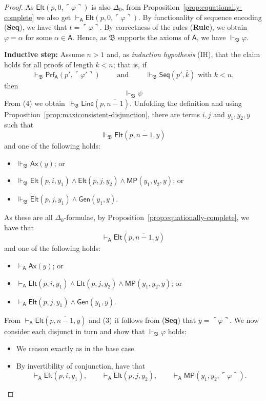 \documentclass[reqno]{asl}
\newcommand{\supp}{\Vdash}
\newcommand{\base}[1]{\mathfrak{#1}}
\renewcommand{\phi}{\varphi}
\newcommand{\pa}{\textsf{A}}
\newcommand{\Prf}{\textsf{Prf}}
\newcommand{\Line}{\textsf{Line}}
\newcommand{\Ax}{\textsf{Ax}}
\newcommand{\Seq}{\textsf{Seq}}
\newcommand{\MP}{\textsf{MP}}
\newcommand{\Gen}{\textsf{Gen}}
\newcommand{\Elt}{\textsf{Elt}}
\begin{document}
\begin{proof}
As $\Elt(p,0,\ulcorner\varphi\urcorner)$ is also $\Delta_0$, from Proposition~\ref{prop:equationally-complete} we also get $\vdash_{\pa} \Elt(p,0,\ulcorner\varphi\urcorner)$. By functionality of sequence encoding (\textbf{Seq}), we have that $t = \ulcorner\varphi\urcorner$. By correctness of the rules (\textbf{Rule}), we obtain $\varphi = \alpha$ for some $\alpha \in \pa$. Hence, as $\base{B}$ supports the axioms of $\pa$, we have $\supp_{\base{B}} \varphi$.

\smallskip
\noindent\textbf{Inductive step:} Assume $n>1$ and, as \emph{induction hypothesis} (IH), that the claim holds for all
proofs of length $k<n$; that is, if
\[
\supp_{\base{B}} \Prf_{\pa}(p', \ulcorner \varphi' \urcorner) \qquad \text{ and } \qquad \supp_{\base{B}} \Seq(p',\bar{k}) \text{ with } k<n, 
\]
then 
\[
\supp_{\base{B}} \psi
\]
From (4) we obtain
$\supp_{\base{B}}\Line(p,\overline{n-1})$. 
Unfolding the definition and using Proposition~\ref{prop:maxiconsistent-disjunction}, there are terms
$i,j$ and $y_1,y_2,y$ such that
\[
\supp_{\base{B}}\Elt(p,\overline{n-1},y)
\]
and one of the following holds:
\begin{itemize}
\item $\supp_{\base{B}}\Ax(y)$; or
\item $\supp_{\base{B}}
\Elt(p,i,y_1)\wedge \Elt(p,j,y_2)\wedge \MP(y_1,y_2,y)$; or
\item $\supp_{\base{B}}
\Elt(p,j,y_1)\wedge \Gen(y_1,y)$.
\end{itemize}
As these are all $\Delta_0$-formulae, by Proposition~\ref{prop:equationally-complete}, we have that
\[
\vdash_{\pa} \Elt(p,\overline{n-1},y)
\]
and one of the following holds:
\begin{itemize}
\item $\vdash_{\pa}\Ax(y)$; or
\item $\vdash_{\pa}\Elt(p,i,y_1)\wedge \Elt(p,j,y_2)\wedge \MP(y_1,y_2,y)$; or
\item $\vdash_{\pa}
\Elt(p,j,y_1)\wedge \Gen(y_1,y)$.
\end{itemize}
From $\vdash_{\pa} \Elt(p,\overline{n-1},y)$ and (3) it follows from (\textbf{Seq}) that $y= \ulcorner \varphi \urcorner$. We now consider each disjunct in turn and show that $\supp_{\base{B}} \phi$ holds: 
\begin{itemize}
    \item We reason exactly as in the base case.
    \item By invertibility of conjunction, have that
\[
\vdash_{\pa} \Elt(p, i, y_1),\qquad \vdash_{\pa}\Elt(p, j, y_2),\qquad \vdash_{\pa}\MP( y_1, y_2,\ulcorner\varphi\urcorner).
\]
\end{itemize}
\end{proof}
\end{document}
